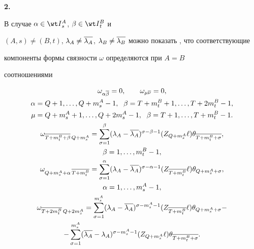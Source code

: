 {\bf 2.}


В случае $\alpha \in \wt I {}^A_s$, $\beta \in \wt I {}^B_t$ и


$(A,s) \neq (B,t)$, $\lambda_A \neq \ol{\lambda_A}$, $\lambda_B \neq


\ol{\lambda_B}$ можно показать \cite{k-diss}, что соответствующие


компоненты формы связности $\omega$ определяются при $A=B$


соотношениями


\begin{gather}


\allowdisplaybreaks


\label{2s2-66}


\omega_{\alpha\ol\beta}=0, \qquad \omega_{\mu\ol\nu}=0, \\


%


\alpha=Q+1,\dotsc,Q+m^A_s-1,\; \ \beta=T+m^B_t+1,\dotsc,T+2m^B_t-1,\notag\\


%


\mu=Q+m^A_s+1,\dotsc, Q+2m^A_s-1,\; \ \beta =T+1,\dotsc,T+m^B_t-1.\notag\\


%


\label{2s2-68}


\omega_{\ol{T+m^B_t+\beta}\, Q+m^A_s}=


\sum\limits_{\sigma=1}^\beta (\lambda_A -\ol{\lambda_A})^{\sigma - \beta -1}


(Z_{Q+m^A_s} \ell ) \theta_{\ol{T+m^B_t+\sigma}},\\


%


\beta = 1,\dotsc,m^B_t-1,\notag \\


%


\label{2s2-69}


\omega_{Q+m^A_s+\alpha \, \ol{T+m^B_t}}=


\sum\limits_{\sigma=1}^\alpha (\lambda_A -\ol{\lambda_A})^{\sigma-\alpha-1}


(Z_{\ol{T+m^B_t}} \ell ) \theta_{Q+m^A_s+\sigma},\\


%


\alpha = 1,\dotsc,m^A_s-1,\notag \\


%


\omega_{\ol{T+2m^B_t}\, Q+2 m^A_s}=


\sum\limits_{\sigma=1}^{m^A_s} (\lambda_A-\ol{\lambda_A})^{\sigma-m^A_s-1}


(Z_{\ol{T+m^B_t}} \ell ) \theta_{Q+m^A_s+\sigma} -\notag \\


%


\label{2s2-70}


-\sum\limits_{\sigma=1}^{m^A_s} (\ol{\lambda_A}-\lambda_A)^{\sigma-m^A_s


-1} (Z_{Q+m^A_s} \ell ) \theta_{\ol{T+m^B_t+\sigma}}.


\end{gather}


